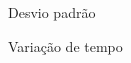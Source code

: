 
\begin{listadesimbolos}
  \item[$\sigma$] Desvio padrão
  \item[$\Delta t$] Variação de tempo
\end{listadesimbolos}
